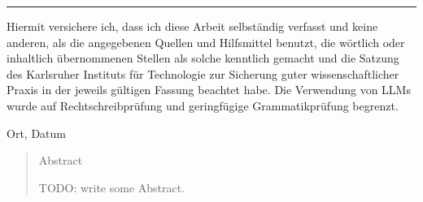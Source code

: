 \documentclass[12pt,a4paper,twoside]{scrartcl}
\numberwithin{equation}{section}
\begin{document}

\vspace*{0pt}\vfill

\hrule\medskip

Hiermit versichere ich, dass ich diese Arbeit selbständig verfasst und keine anderen, als die angegebenen Quellen und Hilfsmittel benutzt, die wörtlich oder inhaltlich übernommenen Stellen als solche kenntlich gemacht und die Satzung des Karlsruher Instituts für Technologie zur Sicherung guter wissenschaftlicher Praxis in der jeweils gültigen Fassung beachtet habe. Die Verwendung von LLMs wurde auf Rechtschreibprüfung und geringfügige Grammatikprüfung begrenzt.

\bigskip

\noindent
Ort, Datum


\vspace*{5cm}

\clearpage


\vspace*{0pt}\vfill

%
%
%

\begin{abstract}
\centerline{Abstract}
  TODO: write some Abstract.
\end{abstract}

\vfill\vfill\vfill
\clearpage


% 
% 
% 


\pagestyle{normal}
\renewcommand\sectionmark[1]{\markboth{\thesection\quad\MakeUppercase{#1}}{\thesection\quad\MakeUppercase{#1}}}
\renewcommand\subsectionmark[1]{\markright{\thesubsection\quad\MakeUppercase{#1}}}
\end{document}
